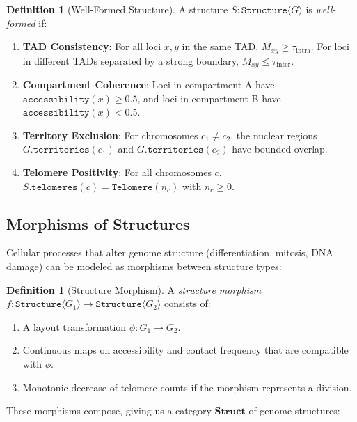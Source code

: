 \documentclass[12pt,a4paper]{article}
\theoremstyle{plain}
\theoremstyle{definition}
\newtheorem{definition}[theorem]{Definition}
\begin{document}
\begin{definition}[Well-Formed Structure]\label{def:well-formed}
A structure $S : \texttt{Structure}\langle G \rangle$ is \emph{well-formed} if:
\begin{enumerate}[label=(WF\arabic*)]
  \item \textbf{TAD Consistency}: For all loci $x, y$ in the same TAD, $M_{xy} \geq \tau_{\text{intra}}$. For loci in different TADs separated by a strong boundary, $M_{xy} \leq \tau_{\text{inter}}$.
  \item \textbf{Compartment Coherence}: Loci in compartment A have $\texttt{accessibility}(x) \geq 0.5$, and loci in compartment B have $\texttt{accessibility}(x) < 0.5$.
  \item \textbf{Territory Exclusion}: For chromosomes $c_1 \neq c_2$, the nuclear regions $G.\texttt{territories}(c_1)$ and $G.\texttt{territories}(c_2)$ have bounded overlap.
  \item \textbf{Telomere Positivity}: For all chromosomes $c$, $S.\texttt{telomeres}(c) = \texttt{Telomere}(n_c)$ with $n_c \geq 0$.
\end{enumerate}
\end{definition}

\subsection{Morphisms of Structures}

Cellular processes that alter genome structure (differentiation, mitosis, DNA damage) can be modeled as morphisms between structure types:

\begin{definition}[Structure Morphism]\label{def:structure-morphism}
A \emph{structure morphism} $f : \texttt{Structure}\langle G_1 \rangle \to \texttt{Structure}\langle G_2 \rangle$ consists of:
\begin{enumerate}[label=(\alph*)]
  \item A layout transformation $\phi : G_1 \to G_2$.
  \item Continuous maps on accessibility and contact frequency that are compatible with $\phi$.
  \item Monotonic decrease of telomere counts if the morphism represents a division.
\end{enumerate}
\end{definition}

These morphisms compose, giving us a category $\mathbf{Struct}$ of genome structures:
\end{document}
